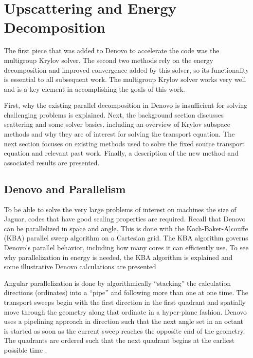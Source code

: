 
\chapter{Upscattering and Energy Decomposition}
\label{sec:Chp2}
The first piece that was added to Denovo to accelerate the code was the multigroup Krylov solver. The second two methods rely on the energy decomposition and improved convergence added by this solver, so its functionality is essential to all subsequent work. The multigroup Krylov solver works very well and is a key element in accomplishing the goals of this work. 

First, why the existing parallel decomposition in Denovo is insufficient for solving challenging problems is explained. Next, the background section discusses scattering and some solver basics, including an overview of Krylov subspace methods and why they are of interest for solving the transport equation. The next section focuses on existing methods used to solve the fixed source transport equation and relevant past work. Finally, a description of the new method and associated results are presented.

\section{Denovo and Parallelism}
To be able to solve the very large problems of interest on machines the size of Jaguar, codes that have good scaling properties are required. Recall that Denovo can be parallelized in space and angle. This is done with the Koch-Baker-Alcouffe (KBA)\cite{Baker1998} parallel sweep algorithm on a Cartesian grid. The KBA algorithm governs Denovo's parallel behavior, including how many cores it can efficiently use. To see why parallelization in energy is needed, the KBA algorithm is explained and some illustrative Denovo calculations are presented

Angular parallelization is done by algorithmically ``stacking'' the calculation directions (ordinates) into a ``pipe'' and following more than one at one time. The transport sweeps begin with the first direction in the first quadrant and spatially move through the geometry along that ordinate in a hyper-plane fashion. Denovo uses a pipelining approach in direction such that the next angle set in an octant is started as soon as the current sweep reaches the opposite end of the geometry. The quadrants are ordered such that the next quadrant begins at the earliest possible time \cite{Evans2009d}. 


